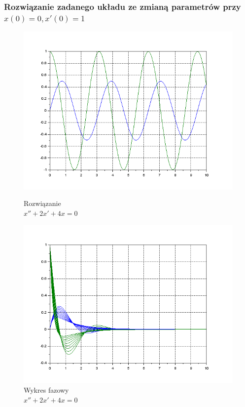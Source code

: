 \documentclass[12pt]{article}
\begin{document}
\subsubsection{Rozwiązanie zadanego układu ze zmianą parametrów przy $x(0)=0, x'(0)=1$}

\begin{figure}[H]
  \centering
  \hspace{-1.6cm}
  \begin{minipage}[b]{0.49\textwidth}
    \includegraphics[scale=0.47]{./img/5-boporu-xy-01}
    \caption{Rozwiązanie \\ \centering $x''+2x'+4x=0$}
  \end{minipage}
  \hfill
  \begin{minipage}[b]{0.49\textwidth}
    \includegraphics[scale=0.47]{./img/5-rowne-xy-01}
    \caption{Wykres fazowy \\
    \centering $x''+2x'+4x=0$}
  \end{minipage}
\end{figure}
\end{document}
